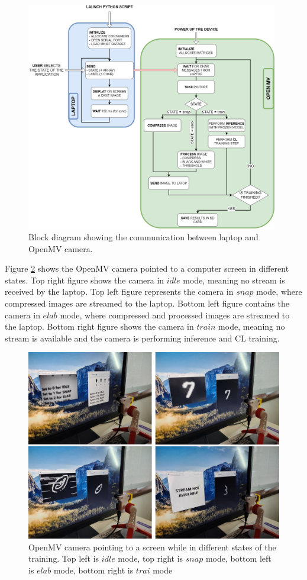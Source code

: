 \documentclass[12pt]{report}
\begin{document}
\begin{figure}[h!]
    \centering
    \includegraphics[width=110mm]{Figures/Chapter4/python_openmv.png} 
    \caption{Block diagram showing the communication between laptop and OpenMV camera.}
    \label{fig:python_openmv_diagram}    
\end{figure}

Figure \ref{fig:openmv_training} shows the OpenMV camera pointed to a computer screen in different states. Top right figure shows the camera in $idle$ mode, meaning no stream is received by the laptop. Top left figure represents the camera in $snap$ mode, where compressed images are streamed to the laptop. Bottom left figure contains the camera in $elab$ mode, where compressed and processed images are streamed to the laptop. Bottom right figure shows the camera in $train$ mode, meaning no stream is available and the camera is performing inference and CL training.

\begin{figure}[h!]
    \centering
    \includegraphics[width=130mm]{Figures/Chapter4/openmv_training.jpg} 
    \caption{OpenMV camera pointing to a screen while in different states of the training. Top left is $idle$ mode, top right is $snap$ mode, bottom left is $elab$ mode, bottom right is $trai$ mode}
    \label{fig:openmv_training}    
\end{figure}
\end{document}
